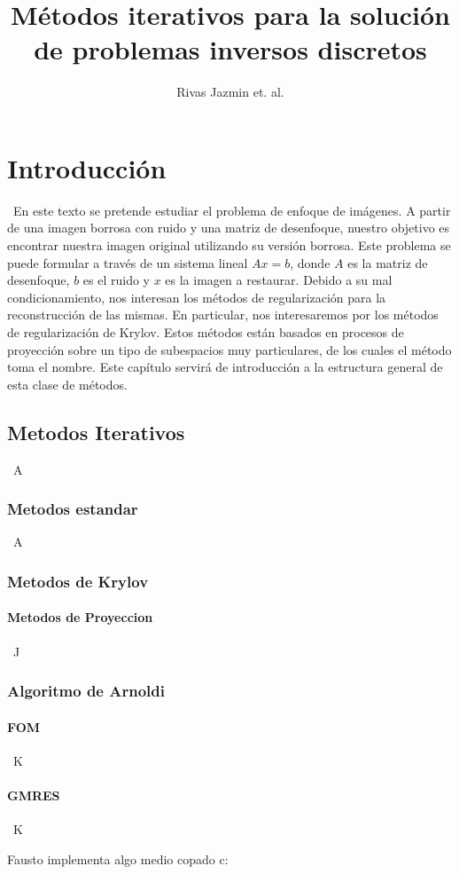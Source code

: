 \documentclass[12pt, oneside]{book}
\title{Métodos iterativos para la solución de problemas inversos discretos}
\author{Rivas Jazmin et. al.}
\date{}
\begin{document}
	\maketitle
	\tableofcontents
	
	
	\chapter{Introducción}
	\ En este texto se pretende estudiar el problema de enfoque de imágenes. A partir de una imagen borrosa con ruido y una matriz de desenfoque, nuestro objetivo es encontrar nuestra imagen original utilizando su versión borrosa. Este problema se puede formular a través de un sistema lineal $Ax = b$, donde $A$ es la matriz de desenfoque, $b$ es el ruido y $x$ es la imagen a restaurar. Debido a su mal condicionamiento, nos interesan los métodos de regularización para la reconstrucción de las mismas. En particular, nos interesaremos por los métodos de regularización de Krylov. Estos métodos están basados en procesos de proyección sobre un tipo de subespacios muy particulares, de los cuales el método toma el nombre. Este capítulo servirá de introducción a la estructura general de esta clase de métodos.
	
	
	\section{Metodos Iterativos}
	\ A
	\subsection{Metodos estandar}
	\ A
	\subsection{Metodos de Krylov}
	\subsubsection{Metodos de Proyeccion}
	\ J
	\subsection{Algoritmo de Arnoldi}
	\subsubsection{FOM}
	\ K
	\subsubsection{GMRES}
	\ K
	
	
	Fausto implementa algo medio copado c:
	
\end{document}
